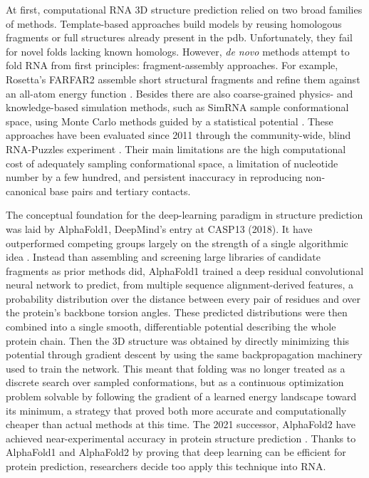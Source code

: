 \documentclass[11pt,a4paper]{article}
\begin{document}
At first, computational RNA 3D structure prediction relied on two broad families of methods. Template-based approaches build models by reusing homologous fragments or full structures already present in the \acrlong{pdb}. Unfortunately, they fail for novel folds lacking known homologs. However, \textit{de novo} methods attempt to fold RNA from first principles: fragment-assembly approaches. For example, Rosetta's FARFAR2 assemble short structural fragments and refine them against an all-atom energy function \cite{watkins2020farfar2}. Besides there are also coarse-grained physics- and knowledge-based simulation methods, such as SimRNA sample conformational space, using Monte Carlo methods guided by a statistical potential \cite{boniecki2016simrna}. These approaches have been evaluated since 2011 through the community-wide, blind RNA-Puzzles experiment \cite{cruz2012rnapuzzles}. Their main limitations are the high computational cost of adequately sampling conformational space, a limitation of nucleotide number by a few hundred, and persistent inaccuracy in reproducing non-canonical base pairs and tertiary contacts.

The conceptual foundation for the deep-learning paradigm in structure prediction was laid by AlphaFold1, DeepMind's entry at CASP13 (2018). It have outperformed competing groups largely on the strength of a single algorithmic idea \cite{senior2020alphafold1}. Instead than assembling and screening large libraries of candidate fragments as prior methods did, AlphaFold1 trained a deep residual convolutional neural network to predict, from multiple sequence alignment-derived features, a probability distribution over the distance between every pair of residues and over the protein's backbone torsion angles. These predicted distributions were then combined into a single smooth, differentiable potential describing the whole protein chain. Then the 3D structure was obtained by directly minimizing this potential through gradient descent by using the same backpropagation machinery used to train the network. This meant that folding was no longer treated as a discrete search over sampled conformations, but as a continuous optimization problem solvable by following the gradient of a learned energy landscape toward its minimum, a strategy that proved both more accurate and computationally cheaper than actual methods at this time.
The 2021 successor, AlphaFold2 have achieved near-experimental accuracy in protein structure prediction \cite{jumper2021alphafold}. Thanks to AlphaFold1 and AlphaFold2 by proving that deep learning can be efficient for protein prediction, researchers decide too apply this technique into RNA. 
\end{document}

